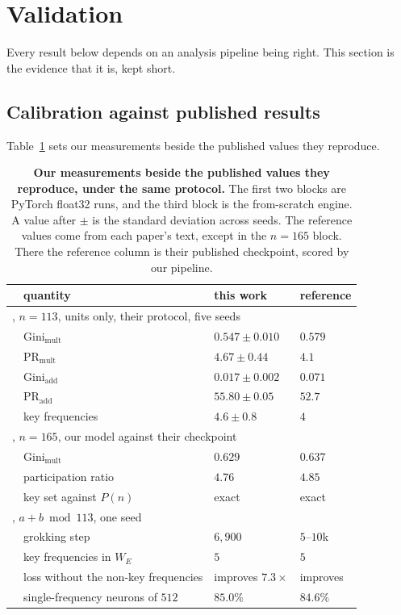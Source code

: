 \section{Validation}
\label{sec:calib}

Every result below depends on an analysis pipeline being right. This section is the evidence
that it is, kept short.

\subsection{Calibration against published results}

Table~\ref{tab:calib} sets our measurements beside the published values they reproduce.

\begin{table}[t]
  \centering
  \caption{\textbf{Our measurements beside the published values they reproduce, under the
    same protocol.} The first two blocks are PyTorch float32 runs, and the third block is
    the from-scratch engine. A value after $\pm$ is the standard deviation across seeds.
    The reference values come from each paper's text, except in the $n = 165$ block. There
    the reference column is their published checkpoint, scored by our pipeline.}
  \label{tab:calib}
  \begin{tabular}{llll}
    \toprule
    & quantity & this work & reference \\
    \midrule
    \multicolumn{4}{l}{\citet{nguyen2026dlogclock}, $n = 113$, units only, their protocol, five seeds} \\
    & $\mathrm{Gini}_{\text{mult}}$ & $0.547 \pm 0.010$ & $0.579$ \\
    & $\mathrm{PR}_{\text{mult}}$ & $4.67 \pm 0.44$ & $4.1$ \\
    & $\mathrm{Gini}_{\text{add}}$ & $0.017 \pm 0.002$ & $0.071$ \\
    & $\mathrm{PR}_{\text{add}}$ & $55.80 \pm 0.05$ & $52.7$ \\
    & key frequencies & $4.6 \pm 0.8$ & $4$ \\
    \midrule
    \multicolumn{4}{l}{\citet{chen2026multiplication}, $n = 165$, our model against their checkpoint} \\
    & $\mathrm{Gini}_{\text{mult}}$ & $0.629$ & $0.637$ \\
    & participation ratio & $4.76$ & $4.85$ \\
    & key set against $P(n)$ & exact & exact \\
    \midrule
    \multicolumn{4}{l}{\citet{nanda2023progress}, $a + b \bmod 113$, one seed} \\
    & grokking step & $6{,}900$ & $5$--$10$k \\
    & key frequencies in $W_{E}$ & $5$ & $5$ \\
    & loss without the non-key frequencies & improves $7.3\times$ & improves \\
    & single-frequency neurons of $512$ & $85.0\%$ & $84.6\%$ \\
    \bottomrule
  \end{tabular}
\end{table}

